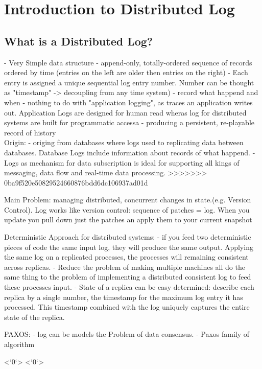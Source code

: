 \chapter{Introduction to Distributed Log}
\label{intro-log}
\section{What is a Distributed Log?}
- Very Simple data structure 
- append-only, totally-ordered sequence of records ordered by time (entries on
the left are older then entries on the right)
- Each entry is assigned a unique sequential log entry number. Number can be
thought as "timestamp" -> decoupling from any time system) 
- record what happend and when 
- nothing to do with "application logging", as traces an application writes
out. Application Logs are designed for human read wheras log for distributed
systems are built for programmatic accessa
- producing a persistent, re-playable record of history
\\
Origin:
- origing from databases where logs used to replicating data between databases.
Database Logs include information about records of what happend. 
- Logs as mechanism for data subscription is ideal for supporting all kings of
messaging, data flow and real-time data processing. 
>>>>>>> 0ba9f520e50829524660876bdd6dc106937ad01d

Main Problem: managing distributed, concurrent changes in state.(e.g. Version
Control). Log works like version control: sequence of patches = log. When you
update you pull down just the patches an apply them to your current snapshot 

Deterministic Approach for distributed systems: 
- if you feed two deterministic pieces of code the same
input log, they will produce the same output. Applying the same log on a
replicated processes, the processes will remaining consistent across replicas. 
- Reduce the problem of making multiple machines all do the same thing to the
problem of implementing a distributed consistent log to feed these processes
input.
- State of a replica can be easy determined: describe each replica by a single
number, the timestamp for the maximum log entry it has processed. This timestamp
combined with the log uniquely captures the entire state of the replica. 

PAXOS: 
- log can be models the Problem of data consensus.  
- Paxos family of algorithm 

<`0`>
<`0`>
